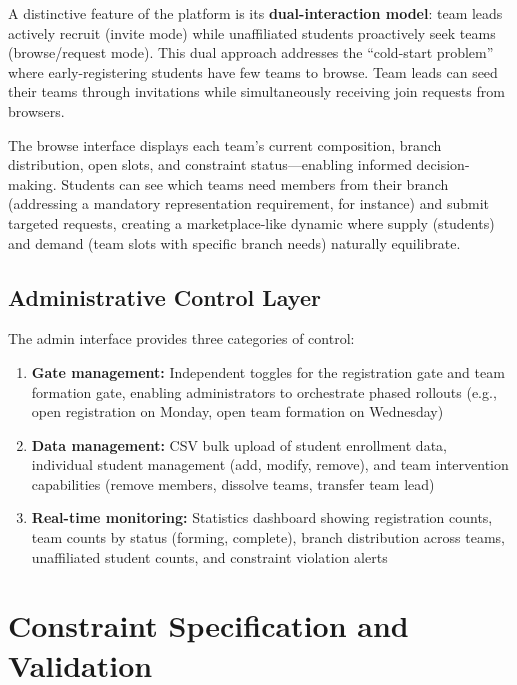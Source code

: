 \documentclass[conference]{IEEEtran}
\begin{document}
A distinctive feature of the platform is its \textbf{dual-interaction model}: team leads actively recruit (invite mode) while unaffiliated students proactively seek teams (browse/request mode). This dual approach addresses the ``cold-start problem'' where early-registering students have few teams to browse. Team leads can seed their teams through invitations while simultaneously receiving join requests from browsers.

The browse interface displays each team's current composition, branch distribution, open slots, and constraint status---enabling informed decision-making. Students can see which teams need members from their branch (addressing a mandatory representation requirement, for instance) and submit targeted requests, creating a marketplace-like dynamic where supply (students) and demand (team slots with specific branch needs) naturally equilibrate.

\subsection{Administrative Control Layer}

The admin interface provides three categories of control:

\begin{enumerate}[noitemsep,topsep=3pt]
    \item \textbf{Gate management:} Independent toggles for the registration gate and team formation gate, enabling administrators to orchestrate phased rollouts (e.g., open registration on Monday, open team formation on Wednesday)
    \item \textbf{Data management:} CSV bulk upload of student enrollment data, individual student management (add, modify, remove), and team intervention capabilities (remove members, dissolve teams, transfer team lead)
    \item \textbf{Real-time monitoring:} Statistics dashboard showing registration counts, team counts by status (forming, complete), branch distribution across teams, unaffiliated student counts, and constraint violation alerts
\end{enumerate}

\section{Constraint Specification and Validation}
\label{sec:constraints}
\end{document}
